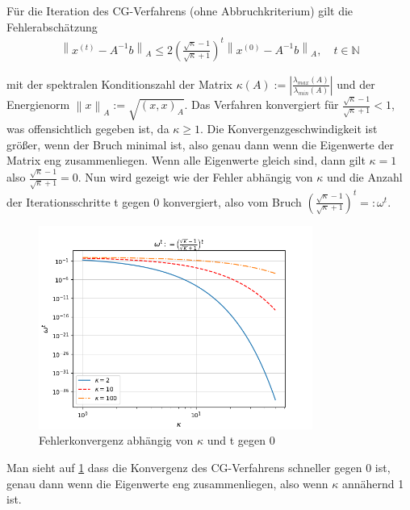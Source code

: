 \documentclass[12pt,a4paper]{scrartcl}
\numberwithin{equation}{section}
\numberwithin{myalgctr}{section}
\numberwithin{mytheoremctr}{subsection}
\numberwithin{mykorollarctr}{subsection}
\numberwithin{mylemmactr}{subsection}
\numberwithin{mybeispielctr}{subsection}
\newcommand\norm[1]{\left\lVert#1\right\rVert}
\begin{document}
	
	Für die Iteration des CG-Verfahrens (ohne Abbruchkriterium) gilt die Fehlerabschätzung \autocite[vgl.][102]{skript}
	\begin{align*}
		\norm{x^{(t)} - A^{-1}b}_A \leq 2\left(\frac{\sqrt{\kappa} - 1}{\sqrt{\kappa} + 1}\right)^{t}\norm{x^{(0)} - A^{-1}b}_A, \quad t\in\mathbb{N}
	\end{align*}
	
	mit der spektralen Konditionszahl der Matrix $\kappa(A) := \left|\frac{\lambda_{max}(A)}{\lambda_{min}(A)}\right|$ und der Energienorm $\norm{x}_A := \sqrt{(x,x)_A}$. Das Verfahren konvergiert für $\frac{\sqrt{\kappa} - 1}{\sqrt{\kappa} + 1} < 1$, was offensichtlich gegeben ist, da $\kappa \geq 1$. Die Konvergenzgeschwindigkeit ist größer, wenn der Bruch minimal ist, also genau dann wenn die Eigenwerte der Matrix eng zusammenliegen. Wenn alle Eigenwerte gleich sind, dann gilt $\kappa = 1$ also $\frac{\sqrt{\kappa} - 1}{\sqrt{\kappa} + 1} = 0$. Nun wird gezeigt wie der Fehler abhängig von $\kappa$ und die Anzahl der Iterationsschritte t gegen 0 konvergiert, also vom Bruch $\left(\frac{\sqrt{\kappa} - 1}{\sqrt{\kappa} + 1}\right)^{t} =: \omega^{t}$.
	
	\begin{figure}[H]
		\begin{center}
			\includegraphics[width=0.8\textwidth]{../plots/fehler cgloglog.png}
		\end{center}
		\caption{Fehlerkonvergenz abhängig von $\kappa$ und t gegen 0}
		\label{fig:fehlercg}	
	\end{figure}

	Man sieht auf \cref{fig:fehlercg} dass die Konvergenz des CG-Verfahrens schneller gegen 0 ist, genau dann wenn die Eigenwerte eng zusammenliegen, also wenn $\kappa$ annähernd 1 ist.
	
\end{document}
